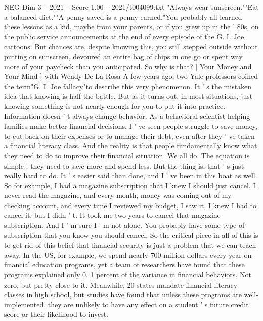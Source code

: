 \begin{textsample}{NEG Dim 3 – 2021 – Score 1.00 – 2021/t004099.txt}  \label{ex:f3_neg_054}
"Always wear sunscreen.""Eat a balanced diet.""A penny saved is a penny earned."You probably all learned these lessons as a kid, maybe from your parents, or if you grew up in the ' 80s, on the public service announcements at the end of every episode of the G.
I.
Joe cartoons.
But chances are, despite knowing this, you still stepped outside without putting on sunscreen, devoured an entire bag of chips in one go or spent way more of your paycheck than you anticipated.
So why is that? [ Your Money and Your Mind ] with Wendy De La Rosa A few years ago, two Yale professors coined the term"G.
I.
Joe fallacy"to describe this very phenomenon.
It ' s the mistaken idea that knowing is half the battle.
But as it turns out, in most situations, just knowing something is not nearly enough for you to put it into practice.
Information doesn ' t always change behavior.
As a behavioral scientist helping families make better financial decisions, I ' ve seen people struggle to save money, to cut back on their expenses or to manage their debt, even after they ' ve taken a financial literacy class.
And the reality is that people fundamentally know what they need to do to improve their financial situation.
We all do.
The equation is simple : they need to save more and spend less.
But the thing is, that ' s just really hard to do.
It ' s easier said than done, and I ' ve been in this boat as well.
So for example, I had a magazine subscription that I knew I should just cancel.
I never read the magazine, and every month, money was coming out of my checking account, and every time I reviewed my budget, I saw it, I knew I had to cancel it, but I didn ' t.
It took me two years to cancel that magazine subscription.
And I ' m sure I ' m not alone.
You probably have some type of subscription that you know you should cancel.
So the critical piece in all of this is to get rid of this belief that financial security is just a problem that we can teach away.
In the US, for example, we spend nearly 700 million dollars every year on financial education programs, yet a team of researchers have found that these programs explained only 0. 1 percent of the variance in financial behaviors.
Not zero, but pretty close to it.
Meanwhile, 20 states mandate financial literacy classes in high school, but studies have found that unless these programs are well-implemented, they are unlikely to have any effect on a student ' s future credit score or their likelihood to invest.

\end{textsample}
